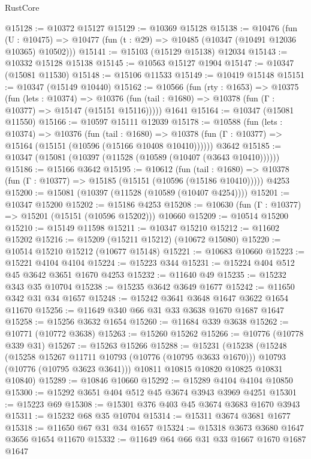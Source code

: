 \begin{lexlean}{RustCore}
\begin{coremodule}
@15128 := @10372 @15127
@15129 := @10369 @15128
@15138 := @10476
    (fun (U : @10475) => @10477 (fun (t : @29) => @10485 (@10347 (@10491 @12036 @10365) @10502)))
@15141 := @15103 (@15129 @15138) @12034
@15143 := @10332 @15128 @15138
@15145 := @10563 @15127 @1904
@15147 := @10347 (@15081 @11530)
@15148 := @15106 @11533
@15149 := @10419 @15148
@15151 := @10347 (@15149 @10440)
@15162 := @10566
    (fun (rty : @1653) =>
    @10375
      (fun (lets : @10374) =>
      @10376 (fun (tail : @1680) => @10378 (fun (Γ : @10377) => @15147 (@15151 @15116)))))
    @1641
@15164 := @10347 (@15081 @11550)
@15166 := @10597 @15111 @12039
@15178 := @10588
    (fun (lets : @10374) =>
    @10376
      (fun (tail : @1680) =>
      @10378 (fun (Γ : @10377) => @15164 (@15151 (@10596 (@15166 @10408 @10410))))))
    @3642
@15185 := @10347 (@15081 (@10397 (@11528 (@10589 (@10407 (@3643 @10410))))))
@15186 := @15166 @3642
@15195 := @10612
    (fun (tail : @1680) => @10378 (fun (Γ : @10377) => @15185 (@15151 (@10596 (@15186 @10410)))))
    @4253
@15200 := @15081 (@10397 (@11528 (@10589 (@10407 @4254))))
@15201 := @10347 @15200
@15202 := @15186 @4253
@15208 := @10630 (fun (Γ : @10377) => @15201 (@15151 (@10596 @15202))) @10660
@15209 := @10514 @15200
@15210 := @15149 @11598
@15211 := @10347 @15210
@15212 := @11602 @15202
@15216 := @15209 (@15211 @15212) (@10672 @15080)
@15220 := @10514 @15210 @15212 (@10677 @15148)
@15221 := @10683 @10660
@15223 := @15221 @4104 @4104
@15224 := @15223 @344
@15231 := @15224 @404 @512 @45 @3642 @3651 @1670 @4253
@15232 := @11640 @49
@15235 := @15232 @343 @35 @10704
@15238 := @15235 @3642 @3649 @1677
@15242 := @11650 @342 @31 @34 @1657
@15248 := @15242 @3641 @3648 @1647 @3622 @1654 @11670
@15256 := @11649 @340 @66 @31 @33 @3638 @1670 @1687 @1647
@15258 := @15256 @3632 @1654
@15260 := @11684 @339 @3638
@15262 := @10771 (@10772 @3638)
@15263 := @15260 @15262
@15266 := @10776 (@10778 @339 @31)
@15267 := @15263 @15266
@15288 := @15231
    (@15238
      (@15248
        (@15258 @15267 @11711 @10793 (@10776 (@10795 @3633 @1670)))
        @10793
        (@10776 (@10795 @3623 @3641)))
      @10811
      @10815
      @10820
      @10825
      @10831
      @10840)
@15289 := @10846 @10660
@15292 := @15289 @4104 @4104 @10850
@15300 := @15292 @3651 @404 @512 @45 @3674 @3943 @3969 @4251
@15301 := @15223 @69
@15308 := @15301 @376 @403 @45 @3674 @3683 @1670 @3943
@15311 := @15232 @68 @35 @10704
@15314 := @15311 @3674 @3681 @1677
@15318 := @11650 @67 @31 @34 @1657
@15324 := @15318 @3673 @3680 @1647 @3656 @1654 @11670
@15332 := @11649 @64 @66 @31 @33 @1667 @1670 @1687 @1647

\end{coremodule}
\end{lexlean}

